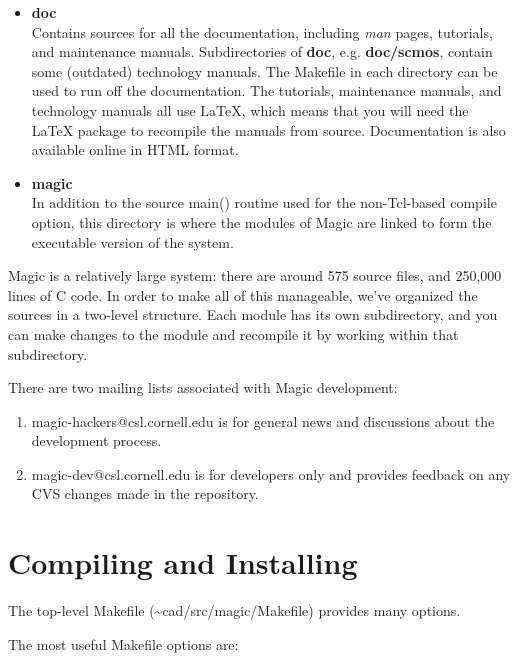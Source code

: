 \documentclass[letterpaper,twoside,12pt]{article}
\begin{document}
\begin{itemize}
\item {\bfseries doc} \\
Contains sources for all the documentation, including {\itshape man}
pages, tutorials, and maintenance manuals.
Subdirectories of {\bfseries doc}, e.g. {\bfseries doc/scmos},
contain some (outdated) technology manuals.
The Makefile in each directory can be used to run
off the documentation.  The tutorials, maintenance manuals,
and technology manuals all use LaTeX, which means that you will need
the LaTeX package to recompile the manuals from source.  Documentation
is also available online in HTML format.

\item {\bfseries magic} \\
In addition to the source main() routine used for the non-Tcl-based
compile option, this directory is where the modules of Magic are
linked to form the executable version of the system.
\end{itemize}

Magic is a relatively large system:  there are around 575 source files,
and 250,000 lines of C code.
In order to make all
of this manageable, we've organized the sources in a two-level
structure.  Each module has its own subdirectory, and you can
make changes to the module and recompile it by working
within that subdirectory.

There are two mailing lists associated with Magic development:
\begin{enumerate}
   \item {\ttfamily magic-hackers@csl.cornell.edu} is for general news
	and discussions about the development process.
   \item {\ttfamily magic-dev@csl.cornell.edu} is for developers only
	and provides feedback on any CVS changes made in the repository.
\end{enumerate}

\section{Compiling and Installing }

The top-level Makefile (\~{}cad/src/magic/Makefile) provides many options.

The most useful Makefile options are:
\end{document}
